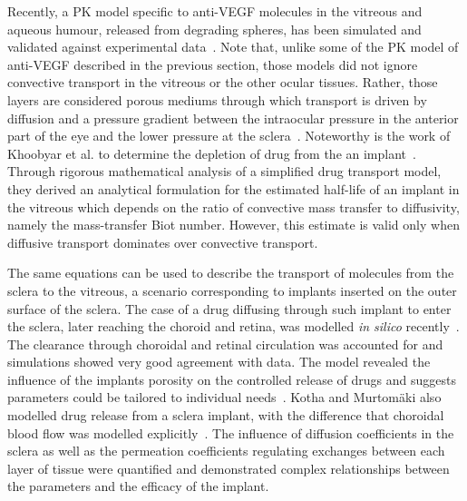\documentclass{article}
\begin{document}
Recently, a PK model specific to anti-VEGF molecules in the vitreous and aqueous humour, released from degrading spheres, has been simulated and validated against experimental data~\cite{Heljak_2022}.
Note that, unlike some of the PK model of anti-VEGF described in the previous section, those models did not ignore convective transport in the vitreous or the other ocular tissues.
Rather, those layers are considered porous mediums through which transport is driven by diffusion and a pressure gradient between the intraocular pressure in the anterior part of the eye and the lower pressure at the sclera~\cite{Ferreira_2018,Ferreira_2020,Heljak_2022,Khoobyar_2021,Li_2022a}.
Noteworthy is the work of Khoobyar et al. to determine the depletion of drug from the an implant~\cite{Khoobyar_2022}.
Through rigorous mathematical analysis of a simplified drug transport model, they derived an analytical formulation for the estimated half-life of an implant in the vitreous which depends on the ratio of convective mass transfer to diffusivity, namely the mass-transfer Biot number.
However, this estimate is valid only when diffusive transport dominates over convective transport.



The same equations can be used to describe the transport of molecules from the sclera to the vitreous, a scenario corresponding to implants inserted on the outer surface of the sclera.
The case of a drug diffusing through such implant to enter the sclera, later reaching the choroid and retina, was modelled \textit{in silico} recently~\cite{Abootorabi_2021}.
The clearance through choroidal and retinal circulation was accounted for and simulations showed very good agreement with data.
The model revealed the influence of the implants porosity on the controlled release of drugs and suggests parameters could be tailored to individual needs~\cite{Abootorabi_2021}.
Kotha and Murtom\"aki also modelled drug release from a sclera implant, with the difference that choroidal blood flow was modelled explicitly~\cite{Kotha_2014}.
The influence of diffusion coefficients in the sclera as well as the permeation coefficients regulating exchanges between each layer of tissue were quantified and demonstrated complex relationships between the parameters and the efficacy of the implant.
\end{document}
